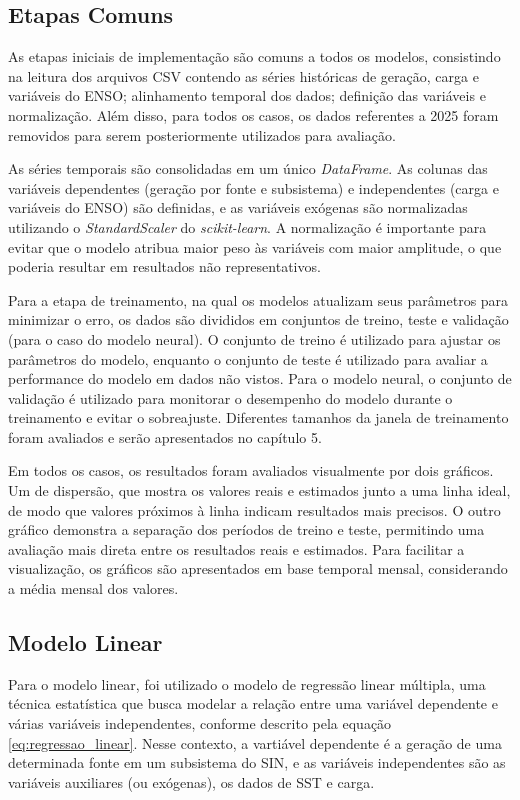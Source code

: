\subsection{Etapas Comuns} %
As etapas iniciais de implementação são comuns a todos os modelos, consistindo na leitura dos arquivos CSV contendo as séries
históricas de geração, carga e variáveis do ENSO; alinhamento temporal dos dados; definição das variáveis e normalização.
Além disso, para todos os casos, os dados referentes a 2025 foram removidos para serem posteriormente utilizados para avaliação.

As séries temporais são consolidadas em um único \textit{DataFrame}. As colunas das variáveis dependentes (geração por fonte e subsistema)
e independentes (carga e variáveis do ENSO) são definidas, e as variáveis exógenas são normalizadas utilizando o \textit{StandardScaler}
do \textit{scikit-learn}. A normalização é importante para evitar que o modelo atribua maior peso às variáveis com maior amplitude,
o que poderia resultar em resultados não representativos.

Para a etapa de treinamento, na qual os modelos atualizam seus parâmetros para minimizar o erro, os dados são divididos
em conjuntos de treino, teste e validação (para o caso do modelo neural). O conjunto de treino é utilizado para ajustar os parâmetros 
do modelo, enquanto o conjunto de teste é utilizado para avaliar a performance do modelo em dados não vistos. Para o modelo neural, o 
conjunto de validação é utilizado para monitorar o desempenho do modelo durante o treinamento e evitar o sobreajuste. Diferentes tamanhos 
da janela de treinamento foram avaliados e serão apresentados no capítulo 5.

Em todos os casos, os resultados foram avaliados visualmente por dois gráficos. Um de dispersão, que mostra os valores
reais e estimados junto a uma linha ideal, de modo que valores próximos à linha indicam resultados mais precisos. O outro gráfico
demonstra a separação dos períodos de treino e teste, permitindo uma avaliação mais direta entre os resultados reais e estimados.
Para facilitar a visualização, os gráficos são apresentados em base temporal mensal, considerando a média mensal dos valores.

\subsection{Modelo Linear} %
Para o modelo linear, foi utilizado o modelo de regressão linear múltipla, uma técnica estatística que busca modelar
a relação entre uma variável dependente e várias variáveis independentes, conforme descrito pela equação \ref{eq:regressao_linear}.
Nesse contexto, a vartiável dependente é a geração de uma determinada fonte em um subsistema do SIN, e as variáveis independentes
são as variáveis auxiliares (ou exógenas), os dados de SST e carga.

